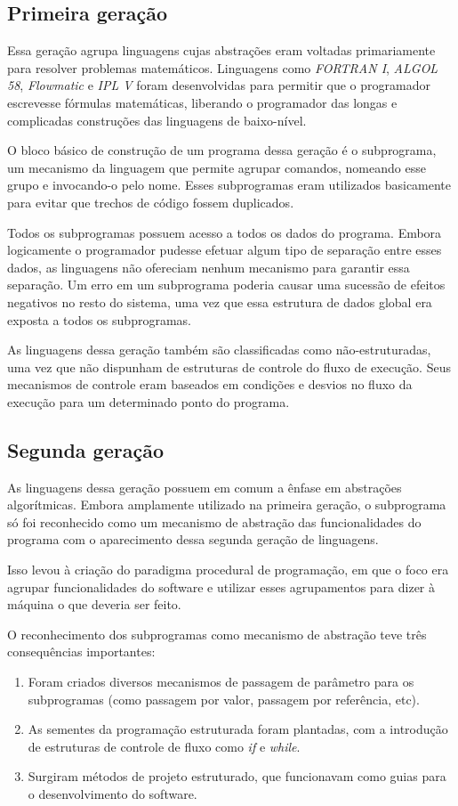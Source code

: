 \documentclass[11pt,twoside,a4paper]{book}
\begin{document}
\subsection*{Primeira geração}
Essa geração agrupa linguagens cujas abstrações eram voltadas primariamente para resolver problemas matemáticos. Linguagens como \emph{FORTRAN I}, \emph{ALGOL 58}, \emph{Flowmatic} e \emph{IPL V} foram desenvolvidas para permitir que o programador escrevesse fórmulas matemáticas, liberando o programador das longas e complicadas construções das linguagens de baixo-nível.

O bloco básico de construção de um programa dessa geração é o subprograma, um mecanismo da linguagem que permite agrupar comandos, nomeando esse grupo e invocando-o pelo nome. Esses subprogramas eram utilizados basicamente para evitar que trechos de código fossem duplicados.

Todos os subprogramas possuem acesso a todos os dados do programa. Embora logicamente o programador pudesse efetuar algum tipo de separação entre esses dados, as linguagens não ofereciam nenhum mecanismo para garantir essa separação. Um erro em um subprograma poderia causar uma sucessão de efeitos negativos no resto do sistema, uma vez que essa estrutura de dados global era exposta a todos os subprogramas.

As linguagens dessa geração também são classificadas como não-estruturadas, uma vez que não dispunham de estruturas de controle do fluxo de execução. Seus mecanismos de controle eram baseados em condições e desvios no fluxo da execução para um determinado ponto do programa.

\subsection*{Segunda geração}
As linguagens dessa geração possuem em comum a ênfase em abstrações algorítmicas. Embora amplamente utilizado na primeira geração, o subprograma só foi reconhecido como um mecanismo de abstração das funcionalidades do programa com o aparecimento dessa segunda geração de linguagens.

Isso levou à criação do paradigma procedural de programação, em que o foco era agrupar funcionalidades do software e utilizar esses agrupamentos para dizer à máquina o que deveria ser feito. 

O reconhecimento dos subprogramas como mecanismo de abstração teve três consequências importantes:

\begin{enumerate}
	\item Foram criados diversos mecanismos de passagem de parâmetro para os subprogramas (como passagem por valor, passagem por referência, etc).
	\item As sementes da programação estruturada foram plantadas, com a introdução de estruturas de controle de fluxo como \emph{if} e \emph{while}.
	\item Surgiram métodos de projeto estruturado, que funcionavam como guias para o desenvolvimento do software.
\end{enumerate}
\end{document}
